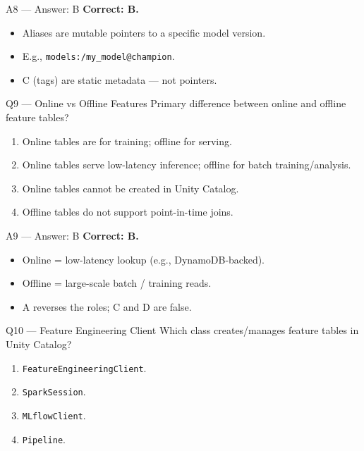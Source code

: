 \documentclass[aspectratio=169,10pt]{beamer}
\begin{document}
	\begin{frame}{A8 — Answer: B}
		\textbf{Correct: B.}
		\begin{itemize}
			\item Aliases are mutable pointers to a specific model version.
			\item E.g., \texttt{models:/my\_model@champion}.
			\item C (tags) are static metadata — not pointers.
		\end{itemize}
	\end{frame}
	
	\begin{frame}{Q9 — Online vs Offline Features}
		Primary difference between online and offline feature tables?
		\begin{enumerate}[label=\Alph*.]
			\item Online tables are for training; offline for serving.
			\item Online tables serve low-latency inference; offline for batch training/analysis.
			\item Online tables cannot be created in Unity Catalog.
			\item Offline tables do not support point-in-time joins.
		\end{enumerate}
	\end{frame}
	
	\begin{frame}{A9 — Answer: B}
		\textbf{Correct: B.}
		\begin{itemize}
			\item Online = low-latency lookup (e.g., DynamoDB-backed).
			\item Offline = large-scale batch / training reads.
			\item A reverses the roles; C and D are false.
		\end{itemize}
	\end{frame}
	
	\begin{frame}{Q10 — Feature Engineering Client}
		Which class creates/manages feature tables in Unity Catalog?
		\begin{enumerate}[label=\Alph*.]
			\item \texttt{FeatureEngineeringClient}.
			\item \texttt{SparkSession}.
			\item \texttt{MLflowClient}.
			\item \texttt{Pipeline}.
		\end{enumerate}
	\end{frame}
	
\end{document}
